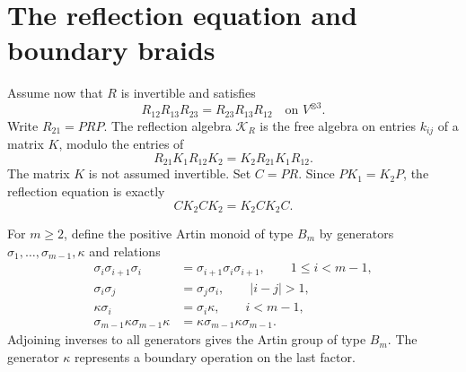 \section{The reflection equation and boundary braids}
Assume now that $R$ is invertible and satisfies
\[
 R_{12}R_{13}R_{23}=R_{23}R_{13}R_{12}
 \quad\text{on }V^{\otimes3}.
\]
Write $R_{21}=PRP$.
The reflection algebra $\mathcal K_R$ is the free algebra on entries
$k_{ij}$ of a matrix $K$, modulo the entries of
\begin{equation}\label{eq:vol1-reflection}
 R_{21}K_1R_{12}K_2=K_2R_{21}K_1R_{12}.
\end{equation}
The matrix $K$ is not assumed invertible.
Set $C=PR$.
Since $PK_1=K_2P$, the reflection equation is exactly
\begin{equation}\label{cbc:reflection:checked}
 C K_2 C K_2=K_2 C K_2 C.
\end{equation}

For $m\geq2$, define the positive Artin monoid of type $B_m$ by generators
$\sigma_1,\ldots,\sigma_{m-1},\kappa$ and relations
\begin{equation}\label{cbc:reflection:artin}
 \begin{aligned}
 \sigma_i\sigma_{i+1}\sigma_i
  &=\sigma_{i+1}\sigma_i\sigma_{i+1},\qquad 1\leq i<m-1,\\
 \sigma_i\sigma_j&=\sigma_j\sigma_i,\qquad |i-j|>1,\\
 \kappa\sigma_i&=\sigma_i\kappa,\qquad i<m-1,\\
 \sigma_{m-1}\kappa\sigma_{m-1}\kappa
  &=\kappa\sigma_{m-1}\kappa\sigma_{m-1}.
 \end{aligned}
\end{equation}
Adjoining inverses to all generators gives the Artin group of type $B_m$.
The generator $\kappa$ represents a boundary operation on the last factor.

